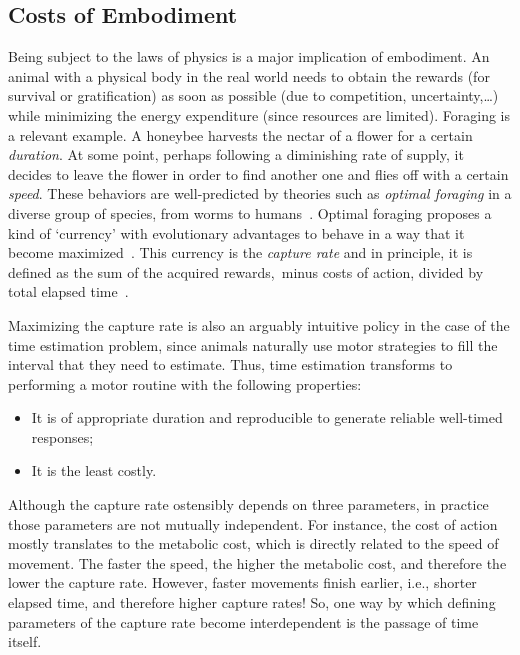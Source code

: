 \subsection{Costs of Embodiment}
\label{ch:intro:cost}
Being subject to the laws of physics is a major implication of embodiment.
An animal with a physical body in the real world needs to obtain the rewards (for survival or gratification) as soon as possible (due to competition, uncertainty,\ldots) while minimizing the energy expenditure (since resources are limited).
Foraging is a relevant example.
A honeybee harvests the nectar of a flower for a certain \textit{duration}.
At some point, perhaps following a diminishing rate of supply, it decides to leave the flower in order to find another one and flies off with a certain \textit{speed}.
These behaviors are well-predicted by theories such as \emph{optimal foraging}\! in a diverse group of species, from worms to humans~\cite{Yoon2018PNAS}.
Optimal foraging proposes a kind of `currency' with evolutionary advantages to behave in a way that it become maximized~\cite{Shadmehr2019TINS,Carland2019NeuroSci}.
This currency is the \emph{capture rate}\! and in principle, it is defined as the sum of the acquired rewards,\footnotemark\ minus costs of action, divided by total elapsed time~\cite{Shadmehr2019TINS}.
\par
Maximizing the capture rate is also an arguably intuitive policy in the case of the time estimation problem, since animals naturally use motor strategies to fill the interval that they need to estimate.
Thus, time estimation transforms to performing a motor routine with the following properties:
\begin{itemize}[noitemsep]
    \item It is of appropriate duration and reproducible to generate reliable well-timed responses;
    \item It is the least costly.
\end{itemize}
Although the capture rate ostensibly depends on three parameters, in practice those parameters are not mutually independent.
For instance, the cost of action mostly translates to the metabolic cost, which is directly related to the speed of movement.
The faster the speed, the higher the metabolic cost, and therefore the lower the capture rate.
However, faster movements finish earlier, i.e., shorter elapsed time, and therefore higher capture rates!
So, one way by which defining parameters of the capture rate become interdependent is the passage of time itself.


